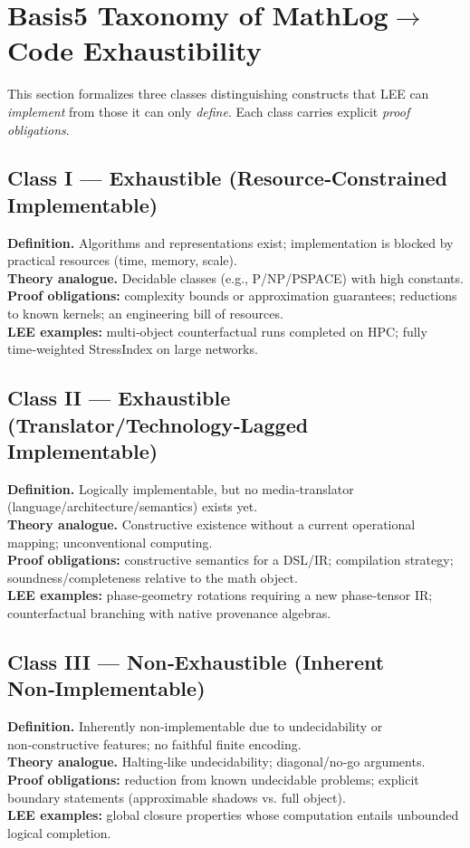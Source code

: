 
\section{Basis5 Taxonomy of MathLog$\rightarrow$Code Exhaustibility}

This section formalizes three classes distinguishing constructs that LEE can \emph{implement} from those it can only \emph{define}. Each class carries explicit \emph{proof obligations}.

\subsection{Class I --- Exhaustible (Resource‑Constrained Implementable)}
\textbf{Definition.} Algorithms and representations exist; implementation is blocked by practical resources (time, memory, scale).\\
\textbf{Theory analogue.} Decidable classes (e.g., P/NP/PSPACE) with high constants.\\
\textbf{Proof obligations:} complexity bounds or approximation guarantees; reductions to known kernels; an engineering bill of resources.\\
\textbf{LEE examples:} multi‑object counterfactual runs completed on HPC; fully time‑weighted StressIndex on large networks.

\subsection{Class II --- Exhaustible (Translator/Technology‑Lagged Implementable)}
\textbf{Definition.} Logically implementable, but no media‑translator (language/architecture/semantics) exists yet.\\
\textbf{Theory analogue.} Constructive existence without a current operational mapping; unconventional computing.\\
\textbf{Proof obligations:} constructive semantics for a DSL/IR; compilation strategy; soundness/completeness relative to the math object.\\
\textbf{LEE examples:} phase‑geometry rotations requiring a new phase‑tensor IR; counterfactual branching with native provenance algebras.

\subsection{Class III --- Non‑Exhaustible (Inherent Non‑Implementable)}
\textbf{Definition.} Inherently non‑implementable due to undecidability or non‑constructive features; no faithful finite encoding.\\
\textbf{Theory analogue.} Halting‑like undecidability; diagonal/no‑go arguments.\\
\textbf{Proof obligations:} reduction from known undecidable problems; explicit boundary statements (approximable shadows vs. full object).\\
\textbf{LEE examples:} global closure properties whose computation entails unbounded logical completion.

